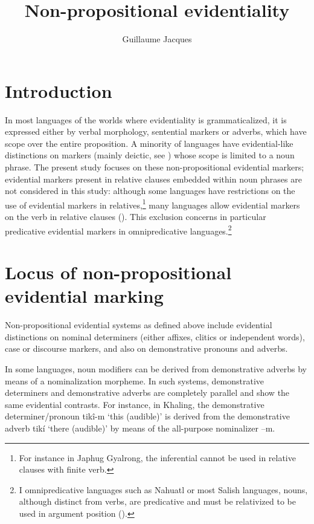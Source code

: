 \documentclass[oneside,a4paper,11pt]{article}
\newcommand{\ipa}[1]{{\phon \mbox{#1}}} %
\begin{document}
 
\sloppy

\title{Non-propositional evidentiality}
\author{Guillaume Jacques}
\maketitle

\section{Introduction}
In most languages of the worlds where evidentiality is grammaticalized, it is expressed either by verbal morphology, sentential markers or adverbs, which have scope over the entire proposition. A minority of languages have evidential-like distinctions on markers (mainly deictic, see \citealt[130]{aikhenvald06}) whose scope is limited to a noun phrase. The present study focuses on these non-propositional evidential markers; evidential markers present in relative clauses embedded within noun phrases are not considered in this study: although some languages have restrictions on the use of evidential markers in relatives,\footnote{For instance in Japhug Gyalrong, the inferential cannot be used in relative clauses with finite verb.} many languages allow evidential markers on the verb in relative clauses (\citealt[253-6]{aikhenvald06}). This exclusion concerns in particular predicative evidential markers in omnipredicative languages.\footnote{I omnipredicative languages such as Nahuatl or most Salish languages, nouns, although distinct from verbs, are predicative and must be relativized to be used in argument position (\citealt{launey94}).}

 \section{Locus of non-propositional evidential marking} \label{sec:loc}
Non-propositional evidential systems as defined above include evidential distinctions on nominal determiners (either affixes, clitics or independent words), case or discourse markers, and also on demonstrative pronouns and adverbs.

In some languages, noun modifiers can be derived from demonstrative adverbs by means of a nominalization morpheme. In such systems, demonstrative determiners and demonstrative adverbs are completely parallel and show the same evidential contrasts. For instance, in Khaling, the demonstrative determiner/pronoun \ipa{tikî-m} `this (audible)' is derived from the demonstrative adverb \ipa{tikí} `there (audible)' by means of the all-purpose nominalizer \ipa{--m}.
\end{document}
